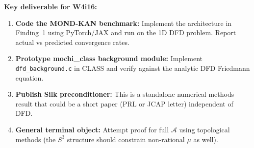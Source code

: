 \documentclass[11pt]{article}
\theoremstyle{definition}
\theoremstyle{remark}
\begin{document}
\textbf{Key deliverable for W4i16:}
\begin{enumerate}[nosep]
\item \textbf{Code the MOND-KAN benchmark:} Implement the architecture
  in Finding~1 using PyTorch/JAX and run on the 1D DFD problem.
  Report actual vs predicted convergence rates.
\item \textbf{Prototype mochi\_class background module:} Implement
  \texttt{dfd\_background.c} in CLASS and verify against the
  analytic DFD Friedmann equation.
\item \textbf{Publish Silk preconditioner:} This is a standalone
  numerical methods result that could be a short paper (PRL or
  JCAP letter) independent of DFD.
\item \textbf{General terminal object:} Attempt proof for full
  $\mathcal{A}$ using topological methods (the $S^3$ structure
  should constrain non-rational $\mu$ as well).
\end{enumerate}
\end{document}
